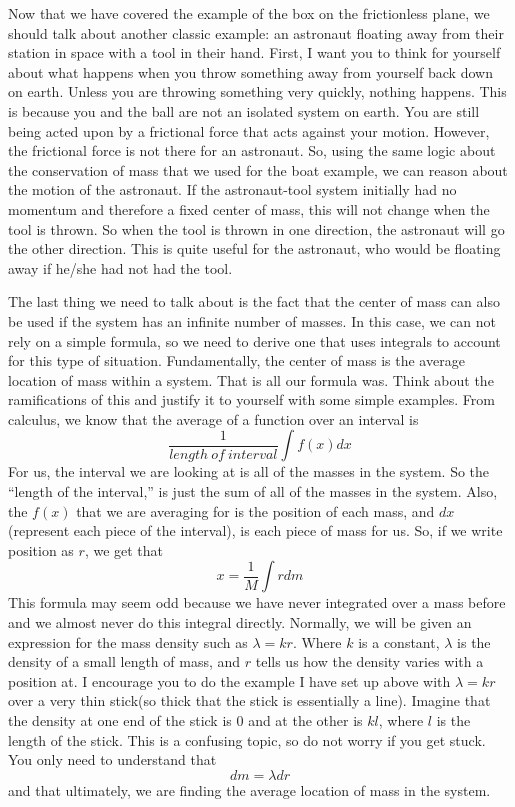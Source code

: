 \documentclass{article}[gray]
\numberwithin{equation}{subsection}
\begin{document}
Now that we have covered the example of the box on the frictionless plane, we should talk about another classic example: an astronaut floating away from their station in space with a tool in their hand. First, I want you to think for yourself about what happens when you throw something away from yourself back down on earth. Unless you are throwing something very quickly, nothing happens. This is because you and the ball are not an isolated system on earth. You are still being acted upon by a frictional force that acts against your motion. However, the frictional force is not there for an astronaut. So, using the same logic about the conservation of mass that we used for the boat example, we can reason about the motion of the astronaut. If the astronaut-tool system initially had no momentum and therefore a fixed center of mass, this will not change when the tool is thrown. So when the tool is thrown in one direction, the astronaut will go the other direction. This is quite useful for the astronaut, who would be floating away if he/she had not had the tool. 

The last thing we need to talk about is the fact that the center of mass can also be used if the system has an infinite number of masses. In this case, we can not rely on a simple formula, so we need to derive one that uses integrals to account for this type of situation. Fundamentally, the center of mass is the average location of mass within a system. That is all our formula was. Think about the ramifications of this and justify it to yourself with some simple examples. From calculus, we know that the average of a function over an interval is $$\frac{1}{length \ of \ interval}\int{f\left(x\right) dx}$$ For us, the interval we are looking at is all of the masses in the system. So the “length of the interval,” is just the sum of all of the masses in the system. Also, the $f\left(x\right)$ that we are averaging for is the position of each mass, and $dx$(represent each piece of the interval), is each piece of mass for us. So, if we write position as $r$, we get that \begin{equation}x=\frac{1}{M}\int{rdm}\end{equation} This formula may seem odd because we have never integrated over a mass before and we almost never do this integral directly. Normally, we will be given an expression for the mass density such as $\lambda=kr$. Where $k$ is a constant, $\lambda$ is the density of a small length of mass, and $r$ tells us how the density varies with a position at. I encourage you to do the example I have set up above with $\lambda=kr$ over a very thin stick(so thick that the stick is essentially a line). Imagine that the density at one end of the stick is 0 and at the other is $kl$, where $l$ is the length of the stick. This is a confusing topic, so do not worry if you get stuck. You only need to understand that $$dm=\lambda dr$$ and that ultimately, we are finding the average location of mass in the system. 
\end{document}
